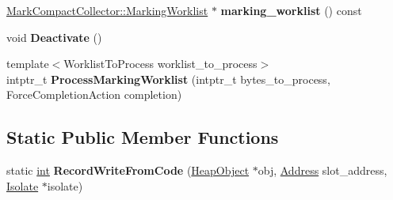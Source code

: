\begin{DoxyCompactItemize}
\item 
\mbox{\label{classv8_1_1internal_1_1IncrementalMarking_aa18073705fe777d42ce2ae2b2376dec0}} 
\mbox{\hyperlink{classv8_1_1internal_1_1MarkCompactCollector_1_1MarkingWorklist}{Mark\+Compact\+Collector\+::\+Marking\+Worklist}} $\ast$ {\bfseries marking\+\_\+worklist} () const
\item 
\mbox{\label{classv8_1_1internal_1_1IncrementalMarking_a7ac012dd6321ef0623ddc0e385ac588a}} 
void {\bfseries Deactivate} ()
\item 
\mbox{\label{classv8_1_1internal_1_1IncrementalMarking_a73a882ba8aceefb5f3dc7a17ea76dc1c}} 
{\footnotesize template$<$Worklist\+To\+Process worklist\+\_\+to\+\_\+process$>$ }\\intptr\+\_\+t {\bfseries Process\+Marking\+Worklist} (intptr\+\_\+t bytes\+\_\+to\+\_\+process, Force\+Completion\+Action completion)
\end{DoxyCompactItemize}
\subsection*{Static Public Member Functions}
\begin{DoxyCompactItemize}
\item 
\mbox{\label{classv8_1_1internal_1_1IncrementalMarking_a6c72577b310a889301a836c154dd7df8}} 
static \mbox{\hyperlink{classint}{int}} {\bfseries Record\+Write\+From\+Code} (\mbox{\hyperlink{classv8_1_1internal_1_1HeapObject}{Heap\+Object}} $\ast$obj, \mbox{\hyperlink{classuintptr__t}{Address}} slot\+\_\+address, \mbox{\hyperlink{classv8_1_1internal_1_1Isolate}{Isolate}} $\ast$isolate)
\end{DoxyCompactItemize}
